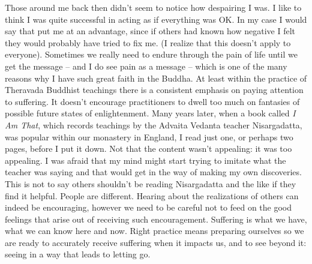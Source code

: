 Those around me back then didn't seem to notice how despairing I was. I
like to think I was quite successful in acting as if everything was OK.
In my case I would say that put me at an advantage, since if others had
known how negative I felt they would probably have tried to fix me. (I
realize that this doesn't apply to everyone). Sometimes we really need
to endure through the pain of life until we get the message -- and I do
see pain as a message -- which is one of the many reasons why I have
such great faith in the Buddha. At least within the practice of
Theravada Buddhist teachings there is a consistent emphasis on paying
attention to suffering. It doesn't encourage practitioners to dwell too
much on fantasies of possible future states of enlightenment. Many years
later, when a book called \emph{I Am That}, which records teachings by
the Advaita Vedanta teacher Nisargadatta, was popular within our
monastery in England, I read just one, or perhaps two pages, before I
put it down. Not that the content wasn't appealing: it was too
appealing. I was afraid that my mind might start trying to imitate what
the teacher was saying and that would get in the way of making my own
discoveries. This is not to say others shouldn't be reading Nisargadatta and
the like if they find it helpful. People are different.
Hearing about the realizations of others can indeed be encouraging, however we need to
be careful not to feed on the good feelings that arise out of receiving
such encouragement. Suffering is what we have, what we can know here and
now. Right practice means preparing ourselves so we are ready to
accurately receive suffering when it impacts us, and to see beyond it:
seeing in a way that leads to letting go.

